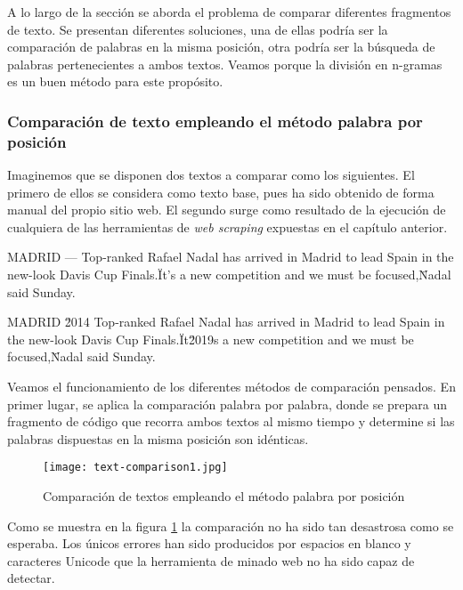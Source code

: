 A lo largo de la sección se aborda el problema de comparar diferentes fragmentos de texto. Se presentan
diferentes soluciones, una de ellas podría ser la comparación de palabras en la misma posición, otra podría
ser la búsqueda de palabras pertenecientes a ambos textos. Veamos porque la división en n-gramas es un
buen método para este propósito.

\subsubsection{Comparación de texto empleando el método palabra por posición}
\label{subsubsec:comparacion de textos empleando el metodo palabra por posicion}

Imaginemos que se disponen dos textos a comparar como los siguientes. El primero de ellos se considera como
texto base, pues ha sido obtenido de forma manual del propio sitio web. El segundo surge como resultado 
de la ejecución de cualquiera de las herramientas de \emph{web scraping} expuestas en el capítulo anterior.

\begin{Schunk}
  \begin{Soutput}
      MADRID — Top-ranked Rafael Nadal has arrived in Madrid to
      lead Spain in the new-look Davis Cup Finals.\n\n\"It’s a
      new competition and we must be focused,\" Nadal said Sunday.

      MADRID \u2014 Top-ranked Rafael Nadal has arrived in Madrid to 
      lead Spain in the new-look Davis Cup Finals.\"It\u2019s a 
      new competition and we must be focused,\" Nadal said Sunday.
  \end{Soutput}
\end{Schunk}

Veamos el funcionamiento de los diferentes métodos de comparación pensados. En primer lugar, se aplica la
comparación palabra por palabra, donde se prepara un fragmento de código que recorra ambos textos al mismo
tiempo y determine si las palabras dispuestas en la misma posición son idénticas.

\begin{figure}[tphb]
  \centering
  \texttt{[image: text-comparison1.jpg]}
  \caption{Comparación de textos empleando el método palabra por posición}
  \label{img:comparacion de textos empleando el metodo palabra por posicion}
\end{figure}

Como se muestra en la figura \ref{img:comparacion de textos empleando el metodo palabra por posicion} la 
comparación no ha sido tan desastrosa como se esperaba. Los únicos errores han sido producidos por espacios 
en blanco y caracteres Unicode que la herramienta de minado web no ha sido capaz de detectar.

